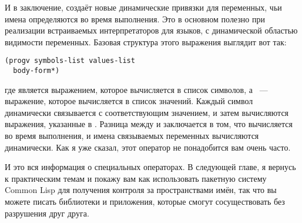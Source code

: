 И в заключение,  создаёт новые динамические привязки для переменных, чьи имена
определяются во время выполнения.  Это в основном полезно при реализации встраиваемых
интерпретаторов для языков, с динамической областью видимости переменных.  Базовая
структура этого выражения выглядит вот так:

\begin{lstlisting}
(progv symbols-list values-list
  body-form*)
\end{lstlisting}

\noindent{}где  является выражением, которое вычисляется в список символов, а
~--- выражение, которое вычисляется в список значений.  Каждый символ
динамически связывается с соответствующим значением, и затем вычисляются выражения,
указанные в .  Разница между  и  заключается в том,
что  вычисляется во время выполнения, и имена связываемых переменных
вычисляются динамически.  Как я уже сказал, этот оператор не понадобится вам очень часто.

И это вся информация о специальных операторах.  В следующей главе, я вернусь к
практическим темам и покажу вам как использовать пакетную систему Common Lisp для
получения контроля за пространствами имён, так что вы можете писать библиотеки и
приложения, которые смогут сосуществовать без разрушения друг друга.

